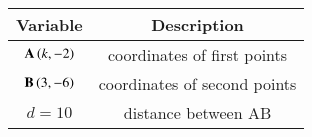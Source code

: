 \begin{tabular}[12pt]{ |c|c|}
    \hline
        \textbf{Variable} & \textbf{Description} \\
    \hline
        $\mathbf{A}\left(k,-2\right)$ & coordinates of first points \\
    \hline 
        $\mathbf{B} \left(3,-6\right)$ & coordinates of second points \\
    \hline 
    $d=10$ &distance between AB\\
    \hline
\end{tabular}

